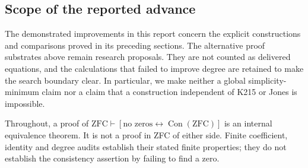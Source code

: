 \subsection{Scope of the reported advance}

The demonstrated improvements in this report concern the explicit
constructions and comparisons proved in its preceding sections.  The
alternative proof substrates above remain research proposals.  They are
not counted as delivered equations, and the calculations that failed to
improve degree are retained to make the search boundary clear.  In
particular, we make neither a global simplicity-minimum claim nor a claim
that a construction independent of K215 or Jones is impossible.

Throughout, a proof of
\(\mathrm{ZFC}\vdash[\text{no zeros}\leftrightarrow
\operatorname{Con}(\mathrm{ZFC})]\)
is an internal equivalence theorem.  It is not a proof in ZFC of either
side.  Finite coefficient, identity and degree audits establish their
stated finite properties; they do not establish the consistency assertion
by failing to find a zero.
